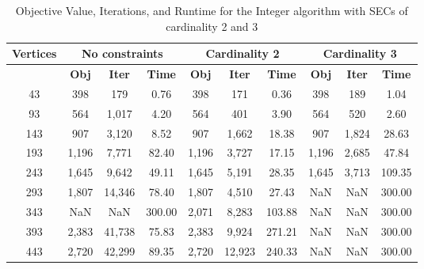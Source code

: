 \documentclass[12pt]{article}
\numberwithin{equation}{section}
\begin{document}
\begin{table}[!ht]
\centering
\begin{tabular}{|c|c|c|c|c|c|c|c|c|c|}
\hline
\textbf{Vertices} & \multicolumn{3}{c|}{\textbf{No constraints}} & \multicolumn{3}{c|}{\textbf{Cardinality 2}} & \multicolumn{3}{c|}{\textbf{Cardinality 3}} \\
\hline
 & \textbf{Obj} & \textbf{Iter} & \textbf{Time} & \textbf{Obj} & \textbf{Iter} & \textbf{Time} & \textbf{Obj} & \textbf{Iter} & \textbf{Time} \\
\hline
      43 &                  398 &                   179 &                  0.76 &                 398 &                  171 &                 0.36 &                 398 &                  189 &                 1.04 \\
      93 &                  564 &                 1,017 &                  4.20 &                 564 &                  401 &                 3.90 &                 564 &                  520 &                 2.60 \\
     143 &                  907 &                 3,120 &                  8.52 &                 907 &                1,662 &                18.38 &                 907 &                1,824 &                28.63 \\
     193 &                1,196 &                 7,771 &                 82.40 &               1,196 &                3,727 &                17.15 &               1,196 &                2,685 &                47.84 \\
     243 &                1,645 &                 9,642 &                 49.11 &               1,645 &                5,191 &                28.35 &               1,645 &                3,713 &               109.35 \\
     293 &                1,807 &                14,346 &                 78.40 &               1,807 &                4,510 &                27.43 &                 NaN &                  NaN &               300.00 \\
     343 &                  NaN &                   NaN &                300.00 &               2,071 &                8,283 &               103.88 &                 NaN &                  NaN &               300.00 \\
     393 &                2,383 &                41,738 &                 75.83 &               2,383 &                9,924 &               271.21 &                 NaN &                  NaN &               300.00 \\
     443 &                2,720 &                42,299 &                 89.35 &               2,720 &               12,923 &               240.33 &                 NaN &                  NaN &               300.00 \\
\hline
\end{tabular}
\caption{Objective Value, Iterations, and Runtime for the Integer algorithm with SECs of cardinality 2 and 3}
\label{table:q2 - frac}
\end{table}
\end{document}
